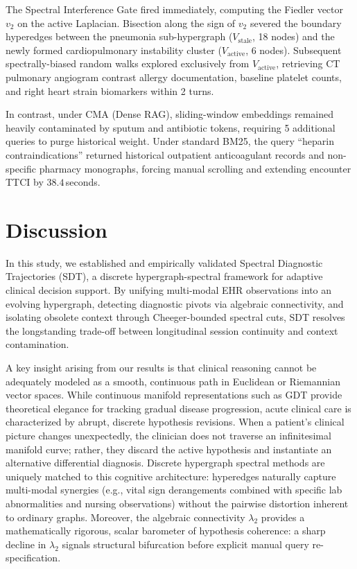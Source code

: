 \documentclass[12pt]{article}
\begin{document}
The Spectral Interference Gate fired immediately, computing the Fiedler vector $v_2$ on the active Laplacian. Bisection along the sign of $v_2$ severed the boundary hyperedges between the pneumonia sub-hypergraph ($V_{\text{stale}}$, 18 nodes) and the newly formed cardiopulmonary instability cluster ($V_{\text{active}}$, 6 nodes). Subsequent spectrally-biased random walks explored exclusively from $V_{\text{active}}$, retrieving CT pulmonary angiogram contrast allergy documentation, baseline platelet counts, and right heart strain biomarkers within 2 turns.

In contrast, under CMA (Dense RAG), sliding-window embeddings remained heavily contaminated by sputum and antibiotic tokens, requiring 5 additional queries to purge historical weight. Under standard BM25, the query ``heparin contraindications'' returned historical outpatient anticoagulant records and non-specific pharmacy monographs, forcing manual scrolling and extending encounter TTCI by $38.4$\,seconds.

\section*{Discussion}

In this study, we established and empirically validated Spectral Diagnostic Trajectories (SDT), a discrete hypergraph-spectral framework for adaptive clinical decision support. By unifying multi-modal EHR observations into an evolving hypergraph, detecting diagnostic pivots via algebraic connectivity, and isolating obsolete context through Cheeger-bounded spectral cuts, SDT resolves the longstanding trade-off between longitudinal session continuity and context contamination.

A key insight arising from our results is that clinical reasoning cannot be adequately modeled as a smooth, continuous path in Euclidean or Riemannian vector spaces. While continuous manifold representations such as GDT provide theoretical elegance for tracking gradual disease progression\cite{huang2017riemannian,moakher2005differential}, acute clinical care is characterized by abrupt, discrete hypothesis revisions. When a patient's clinical picture changes unexpectedly, the clinician does not traverse an infinitesimal manifold curve; rather, they discard the active hypothesis and instantiate an alternative differential diagnosis. Discrete hypergraph spectral methods are uniquely matched to this cognitive architecture: hyperedges naturally capture multi-modal synergies (e.g., vital sign derangements combined with specific lab abnormalities and nursing observations) without the pairwise distortion inherent to ordinary graphs\cite{feng2019hypergraph,zhou2006learning}. Moreover, the algebraic connectivity $\lambda_2$ provides a mathematically rigorous, scalar barometer of hypothesis coherence: a sharp decline in $\lambda_2$ signals structural bifurcation before explicit manual query re-specification.
\end{document}
